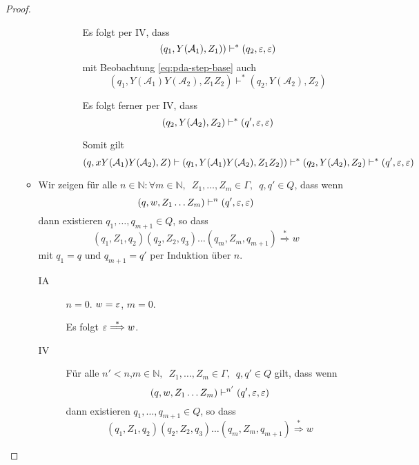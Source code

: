 \begin{proof}
\begin{itemize}
\begin{itemize}
\begin{description}
\begin{itemize}
          Es folgt per IV, dass
          \begin{displaymath}
            (q_1, Y(\mathcal{A}_1), Z_1)) \vdash^* (q_2, \varepsilon, \varepsilon)
          \end{displaymath}
          mit Beobachtung \eqref{eq:pda-step-base} auch
          \begin{displaymath}
            (q_1, Y(\mathcal{A}_1)Y(\mathcal{A}_2), Z_1Z_2) \vdash^* (q_2, Y(\mathcal{A}_2), Z_2)
          \end{displaymath}

          Es folgt ferner per IV, dass
          \begin{displaymath}
            (q_2, Y(\mathcal{A}_2), Z_2) \vdash^* (q', \varepsilon, \varepsilon)
          \end{displaymath}

          Somit gilt
          \begin{displaymath}
            (q, xY(\mathcal{A}_1)Y(\mathcal{A}_2), Z) \vdash (q_1, Y(\mathcal{A}_1)Y(\mathcal{A}_2), Z_1Z_2)) \vdash^* (q_2, Y(\mathcal{A}_2), Z_2) \vdash^* (q', \varepsilon, \varepsilon)
          \end{displaymath}
          
          
        \end{itemize}
      \end{description}

    \item Wir zeigen für alle $n \in \mathbb{N}: \forall m \in \mathbb{N},\enspace Z_1,\ldots,Z_m \in \Gamma,\enspace q,q' \in Q$, dass wenn
      \begin{displaymath}
        (q,w,Z_1\ldots Z_m) \vdash^n (q', \varepsilon, \varepsilon)
      \end{displaymath}
      dann existieren $q_1,\ldots,q_{m+1} \in Q$, so dass
      \begin{displaymath}
        (q_1,Z_1,q_2)(q_2,Z_2,q_3)\ldots(q_m,Z_m,q_{m+1}) \stackrel{*}{\Longrightarrow} w
      \end{displaymath}
      mit $q_1 = q$ und $q_{m+1} = q'$ per Induktion über $n$.

      \begin{description}
      \item[IA] $n = 0$.
        $w = \varepsilon$, $m = 0$.

        Es folgt $\varepsilon \stackrel{*}{\Longrightarrow} w$.
      \item[IV] Für alle $n' < n$,\enspace $m \in \mathbb{N},\enspace Z_1,\ldots,Z_m\in \Gamma,\enspace q,q' \in Q$ gilt, dass wenn
        \begin{displaymath}
        (q,w,Z_1\ldots Z_m) \vdash^{n'} (q', \varepsilon, \varepsilon)
      \end{displaymath}
      dann existieren $q_1,\ldots,q_{m+1} \in Q$, so dass
      \begin{displaymath}
        (q_1,Z_1,q_2)(q_2,Z_2,q_3)\ldots(q_m,Z_m,q_{m+1}) \stackrel{*}{\Longrightarrow} w
      \end{displaymath}


\end{description}
\end{itemize}
\end{itemize}
\end{proof}
